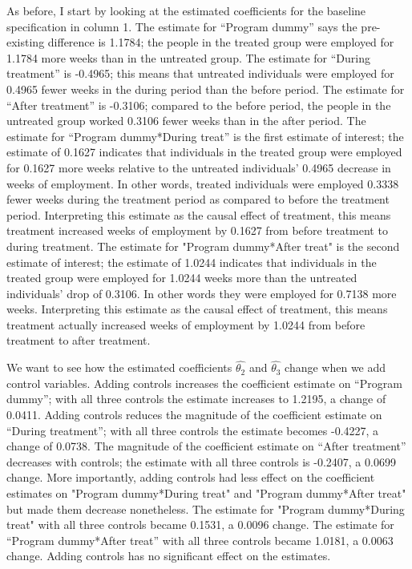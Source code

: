 \documentclass[a4paper]{article}
\begin{document}
\begin{table}[H]
\centering

\end{table}

As before, I start by looking at the estimated coefficients for the baseline specification in column 1. The estimate for “Program dummy” says the pre-existing difference is 1.1784; the people in the treated group were employed for 1.1784 more weeks than in the untreated group. The estimate for “During treatment” is -0.4965; this means that untreated individuals were employed for 0.4965 fewer weeks in the during period than the before period. The estimate for “After treatment” is -0.3106; compared to the before period, the people in the untreated group worked 0.3106 fewer weeks than in the after period. The estimate for “Program dummy*During treat” is the first estimate of interest; the estimate of 0.1627 indicates that individuals in the treated group were employed for 0.1627 more weeks relative to the untreated individuals’ 0.4965 decrease in weeks of employment. In other words, treated individuals were employed 0.3338 fewer weeks during the treatment period as compared to before the treatment period. Interpreting this estimate as the causal effect of treatment, this means treatment increased weeks of employment by 0.1627 from before treatment to during treatment. The estimate for "Program dummy*After treat" is the second estimate of interest; the estimate of 1.0244 indicates that individuals in the treated group were employed for 1.0244 weeks more than the untreated individuals’ drop of 0.3106. In other words they were employed for 0.7138 more weeks. Interpreting this estimate as the causal effect of treatment, this means treatment actually increased weeks of employment by 1.0244 from before treatment to after treatment. 

We want to see how the estimated coefficients $\hat{\theta_{2}}$ and $\hat{\theta_{3}}$ change when we add control variables. Adding controls increases the coefficient estimate on “Program dummy”; with all three controls the estimate increases to 1.2195, a change of 0.0411. Adding controls reduces the magnitude of the coefficient estimate on “During treatment”; with all three controls the estimate becomes -0.4227, a change of 0.0738. The magnitude of the coefficient estimate on “After treatment” decreases with controls; the estimate with all three controls is -0.2407, a 0.0699 change. More importantly, adding controls had less effect on the coefficient estimates on "Program dummy*During treat" and "Program dummy*After treat" but made them decrease nonetheless. The estimate for  "Program dummy*During treat" with all three controls became 0.1531, a 0.0096 change. The estimate for “Program dummy*After treat” with all three controls became 1.0181, a 0.0063 change. Adding controls has no significant effect on the estimates.
\end{document}
